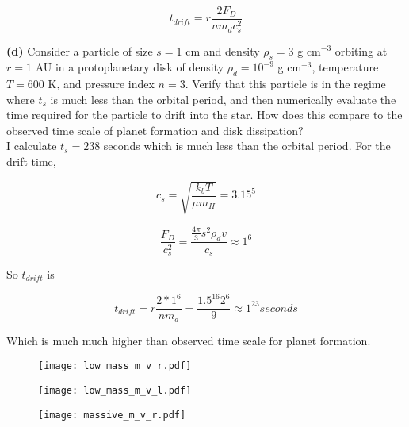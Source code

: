 \documentclass[12pt]{article}
\begin{document}
\begin{equation}
t_{drift} = r \frac{2F_D}{nm_dc_s^2}
\end{equation}


\noindent \textbf{(d)} Consider a particle of size $s = 1$ cm and density $\rho_s = 3$ g cm$^{-3}$ orbiting at $r = 1$ AU in a protoplanetary disk of density $\rho_d = 10^{-9}$ g cm$^{-3}$, temperature $T = 600$ K, and pressure index $n = 3$. Verify that this particle is in the regime where $t_s$ is much less than the orbital period, and then numerically evaluate the time required for the particle to drift into the star. How does this compare to the observed time scale of planet formation and disk dissipation? \\


\noindent I calculate $t_s = 238$ seconds which is much less than the orbital period. For the drift time,

\begin{equation}
c_s = \sqrt{\frac{k_bT}{\mu m_H}} = 3.15^{5}
\end{equation}

\begin{equation}
\frac{F_D}{c_s^2} = \frac{\frac{4\pi}{3}s^2\rho_dv}{c_s}  \approx 1^{6} 
\end{equation}

\noindent So $t_{drift}$ is 

\begin{equation}
t_{drift} = r \frac{2*1^6}{nm_d} = \frac{1.5^{16} 2^{6}}{9} \approx 1^{23} seconds
\end{equation}

\noindent Which is much much higher than observed time scale for planet formation.
\begin{figure}[H]
\texttt{[image: low\_mass\_m\_v\_r.pdf]}
\end{figure}

\begin{figure}[H]
\texttt{[image: low\_mass\_m\_v\_l.pdf]}
\end{figure}

\begin{figure}[H]
\texttt{[image: massive\_m\_v\_r.pdf]}
\end{figure}
\end{document}
